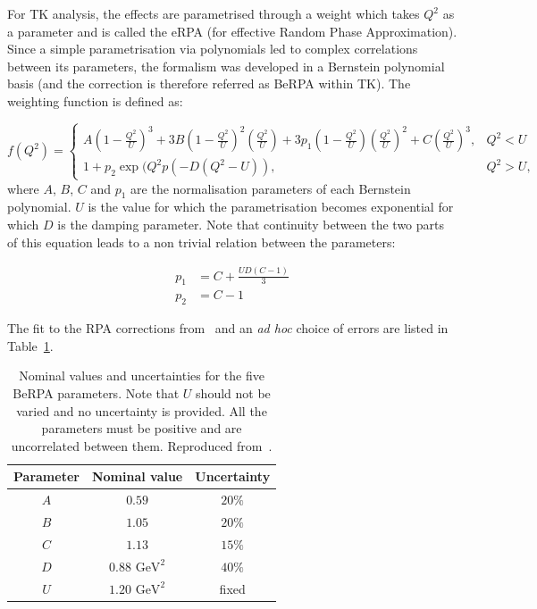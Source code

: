 For \Gls{TK} analysis, the effects are parametrised through a weight
which takes $Q^2$ as a parameter and is called the e\Gls{RPA} (for
effective Random Phase Approximation). Since a simple parametrisation
via polynomials led to complex correlations between its parameters,
the formalism was developed in a Bernstein polynomial basis (and the
correction is therefore referred as \Gls{BeRPA} within \Gls{TK}). The
weighting function is defined as:

\begin{equation*}
  \label{eq:BeRPA}
  f(Q^2) = 
  \begin{cases}
    A(1-\frac{Q^2}{U})^{3} + 3B(1-\frac{Q^2}{U})^{2}\left(\frac{Q^2}{U}\right) + 3p_{1}(1-\frac{Q^2}{U})\left(\frac{Q^2}{U}\right)^{2} + C\left(\frac{Q^2}{U}\right)^{3}, & Q^2 < U \\
    1 + p_{2}\exp(Q^2p(-D(Q^2-U)), & Q^2 > U,
  \end{cases}
\end{equation*}
where $A$, $B$, $C$ and $p_1$ are the normalisation parameters of each
Bernstein polynomial. $U$ is the value for which the parametrisation
becomes exponential for which $D$ is the damping parameter.  Note that
continuity between the two parts of this equation leads to a non
trivial relation between the parameters:

\begin{align*}
  \label{eq:BeRPAcont}
  p_{1} &= C + \frac{UD(C-1)}{3}\\
  p_{2} &= C - 1
\end{align*}

The fit to the \Gls{RPA} corrections from~\cite{NievesCCinc} and an
{\it ad hoc} choice of errors are listed in Table~\ref{tab:BeRPA}.

\begin{table}[h!]
  \center
  \begin{tabular}{ccc}
    \toprule
    Parameter & Nominal value & Uncertainty \\ 
    \midrule
    $A$ &  $0.59$ & $20\%$ \\
    $B$ &  $1.05$ & $20\%$ \\
    $C$ &  $1.13$ & $15\%$ \\
    $D$ &  $0.88\text{~GeV}^2$ & $40\%$ \\
    $U$ &  $1.20\text{~GeV}^2$ & fixed \\
    \bottomrule
  \end{tabular}
  \caption[Nominal values and uncertainties for the five BeRPA
  parameters]{Nominal values and uncertainties for the five
    \Gls{BeRPA} parameters. Note that $U$ should not be varied and no
    uncertainty is provided. All the parameters must be positive and
    are uncorrelated between them. Reproduced from~\cite{TN315}.}
  \label{tab:BeRPA}
\end{table}


